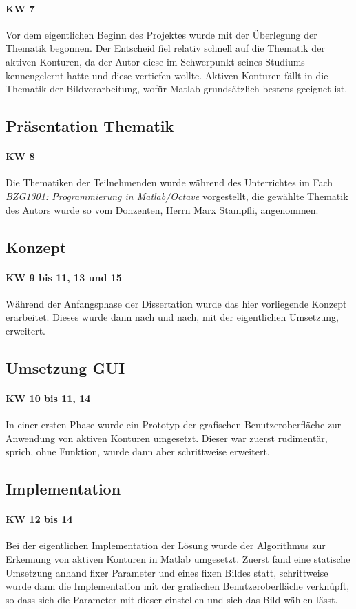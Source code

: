 \paragraph{KW 7}
Vor dem eigentlichen Beginn des Projektes wurde mit der Überlegung der Thematik begonnen. Der Entscheid fiel relativ schnell auf die Thematik der aktiven Konturen, da der Autor diese im Schwerpunkt seines Studiums kennengelernt hatte und diese vertiefen wollte. Aktiven Konturen fällt in die Thematik der Bildverarbeitung, wofür Matlab grundsätzlich bestens geeignet ist.

\subsection{Präsentation Thematik}
\label{subsec:topicpres}
\paragraph{KW 8}
Die Thematiken der Teilnehmenden wurde während des Unterrichtes im Fach \textit{BZG1301: Programmierung in Matlab/Octave} vorgestellt, die gewählte Thematik des Autors wurde so vom Donzenten, Herrn Marx Stampfli, angenommen.

\subsection{Konzept}
\label{subsec:concept}
\paragraph{KW 9 bis 11, 13 und 15}
Während der Anfangsphase der Dissertation wurde das hier vorliegende Konzept erarbeitet. Dieses wurde dann nach und nach, mit der eigentlichen Umsetzung, erweitert.

\subsection{Umsetzung GUI}
\label{subsec:gui}
\paragraph{KW 10 bis 11, 14}
In einer ersten Phase wurde ein Prototyp der grafischen Benutzeroberfläche zur Anwendung von aktiven Konturen umgesetzt. Dieser war zuerst rudimentär, sprich, ohne Funktion, wurde dann aber schrittweise erweitert.

\subsection{Implementation}
\label{subsec:impl}
\paragraph{KW 12 bis 14}
Bei der eigentlichen Implementation der Lösung wurde der Algorithmus zur Erkennung von aktiven Konturen in Matlab umgesetzt. Zuerst fand eine statische Umsetzung anhand fixer Parameter und eines fixen Bildes statt, schrittweise wurde dann die Implementation mit der grafischen Benutzeroberfläche verknüpft, so dass sich die Parameter mit dieser einstellen und sich das Bild wählen lässt.
